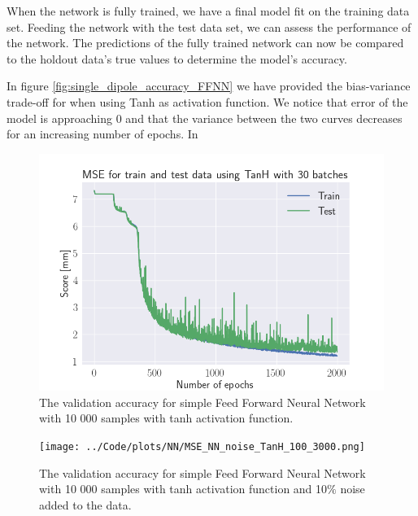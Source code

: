 \documentclass[a4paper, UKenglish, 11pt]{uiomaster}
\begin{document}
When the network is fully trained, we have a final model fit on the training data set. Feeding the network with the test data set, we can assess the performance of the network. The predictions of the fully trained network can now be compared to the holdout data's true values to determine the model's accuracy.

In figure \ref{fig:single_dipole_accuracy_FFNN} we have provided the bias-variance trade-off for when using Tanh as activation function. We notice that error of the model is approaching 0 and that the variance between the two curves decreases for an increasing number of epochs. In

\begin{figure}[!htb]
    \centering
    \includegraphics[width=\linewidth]{../Code/plots/NN/MSE_NN_TanH_30_2000.png}
    \caption{The validation accuracy for simple Feed Forward Neural Network with 10 000 samples with tanh activation function. }
    \label{fig:single_dipole_accuracy}
\end{figure}

\begin{figure}[!htb]
    \centering
    \texttt{[image: ../Code/plots/NN/MSE\_NN\_noise\_TanH\_100\_3000.png]}
    \caption{The validation accuracy for simple Feed Forward Neural Network with 10 000 samples with tanh activation function and 10$\%$ noise added to the data. }
    \label{fig:single_dipole_accuracy}
\end{figure}
\end{document}
